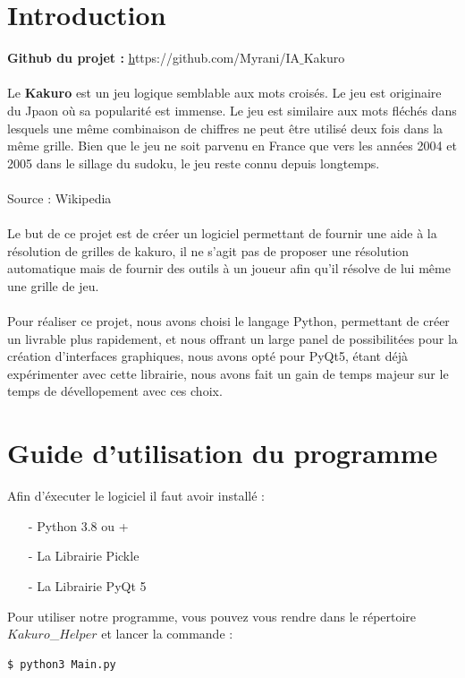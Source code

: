 \documentclass[french,12pt]{article}
\begin{document}
\thispagestyle{empty}
\setcounter{page}{0}
\newpage
\renewcommand{\contentsname}{Table des matières}
\tableofcontents
\newpage


\section{Introduction}
\textbf{Github du projet :} \href{https://github.com/Myrani/IA_Kakuro}https://github.com/Myrani/IA$\_$Kakuro \\ \\

Le \textbf{Kakuro} est un jeu logique semblable aux mots croisés. Le jeu est originaire du Jpaon où sa popularité est immense. Le jeu est similaire aux mots fléchés dans lesquels une même combinaison de chiffres ne peut être utilisé deux fois dans la même grille. Bien que le jeu ne soit parvenu en France que vers les années 2004 et 2005 dans le sillage du sudoku, le jeu reste connu depuis longtemps. \\ \\ Source : Wikipedia \\ \\
Le but de ce projet est de créer un logiciel permettant de fournir une aide à la résolution de grilles de kakuro, il ne s'agit pas de proposer une résolution automatique mais de fournir des outils à un joueur afin qu'il résolve de lui même une grille de jeu. \\\ \\
Pour réaliser ce projet, nous avons choisi le langage Python, permettant de créer un livrable plus rapidement, et nous offrant un large panel de possibilitées pour la création d'interfaces graphiques, nous avons opté pour PyQt5, étant déjà expérimenter avec cette librairie, nous avons fait un gain de temps majeur sur le temps de dévellopement avec ces choix.
\section{Guide d'utilisation du programme}
Afin d'éxecuter le logiciel il faut avoir installé :
\begin{enumerate}
\item[-] Python 3.8 ou +
\item[-] La Librairie Pickle
\item[-] La Librairie PyQt 5
\end{enumerate} 
Pour utiliser notre programme, vous pouvez vous rendre dans le répertoire $Kakuro$\_$Helper$ et lancer la commande :
\begin{lstlisting}[language=bash]
  $ python3 Main.py
\end{lstlisting}
\end{document}
